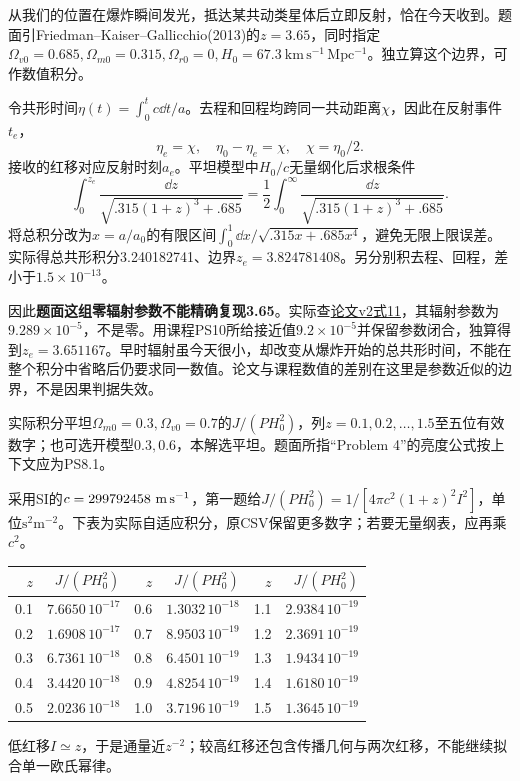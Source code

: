\begin{exercise}
从我们的位置在爆炸瞬间发光，抵达某共动类星体后立即反射，恰在今天收到。题面引Friedman--Kaiser--Gallicchio(2013)的$z=3.65$，同时指定$\Omega_{v0}=0.685,\Omega_{m0}=0.315,\Omega_{r0}=0,H_0=67.3\ \mathrm{km\,s^{-1}\,Mpc^{-1}}$。独立算这个边界，可作数值积分。
\end{exercise}
\begin{solution}
令共形时间$\eta(t)=\int_0^t c\dd t/a$。去程和回程均跨同一共动距离$\chi$，因此在反射事件$t_e$，
\[
 \eta_e=\chi,\quad \eta_0-\eta_e=\chi,\quad
 \chi=\eta_0/2.
\]
接收的红移对应反射时刻$a_e$。平坦模型中$H_0/c$无量纲化后求根条件
\[
 \int_0^{z_e}\frac{\dd z}{\sqrt{.315(1+z)^3+.685}}
 =\frac12\int_0^\infty\frac{\dd z}{\sqrt{.315(1+z)^3+.685}}.
\]
将总积分改为$x=a/a_0$的有限区间$\int_0^1\dd x/\sqrt{.315x+.685x^4}$，避免无限上限误差。实际得总共形积分3.240182741、边界$z_e=3.824781408$。另分别积去程、回程，差小于$1.5\times10^{-13}$。

因此\textbf{题面这组零辐射参数不能精确复现3.65}。实际查\href{https://arxiv.org/html/1305.3943v2}{论文v2式11}，其辐射参数为$9.289\times10^{-5}$，不是零。用课程PS10所给接近值$9.2\times10^{-5}$并保留参数闭合，独算得到$z_e=3.651167$。早时辐射虽今天很小，却改变从爆炸开始的总共形时间，不能在整个积分中省略后仍要求同一数值。论文与课程数值的差别在这里是参数近似的边界，不是因果判据失效。
\end{solution}

\begin{exercise}
实际积分平坦$\Omega_{m0}=0.3,\Omega_{v0}=0.7$的$J/(PH_0^2)$，列$z=0.1,0.2,\ldots,1.5$至五位有效数字；也可选开模型$0.3,0.6$，本解选平坦。题面所指“Problem 4”的亮度公式按上下文应为PS8.1。
\end{exercise}
\begin{solution}
采用SI的$c=299792458\ {\rm m\,s^{-1}}$，第一题给$J/(PH_0^2)=1/[4\pi c^2(1+z)^2I^2]$，单位$\mathrm{s^2m^{-2}}$。下表为实际自适应积分，原CSV保留更多数字；若要无量纲表，应再乘$c^2$。
\begin{center}\begin{tabular}{rr|rr|rr}
\toprule
$z$&$J/(PH_0^2)$&$z$&$J/(PH_0^2)$&$z$&$J/(PH_0^2)$\\
\midrule
0.1&$7.6650\,10^{-17}$&0.6&$1.3032\,10^{-18}$&1.1&$2.9384\,10^{-19}$\\
0.2&$1.6908\,10^{-17}$&0.7&$8.9503\,10^{-19}$&1.2&$2.3691\,10^{-19}$\\
0.3&$6.7361\,10^{-18}$&0.8&$6.4501\,10^{-19}$&1.3&$1.9434\,10^{-19}$\\
0.4&$3.4420\,10^{-18}$&0.9&$4.8254\,10^{-19}$&1.4&$1.6180\,10^{-19}$\\
0.5&$2.0236\,10^{-18}$&1.0&$3.7196\,10^{-19}$&1.5&$1.3645\,10^{-19}$\\
\bottomrule\end{tabular}\end{center}
低红移$I\simeq z$，于是通量近$z^{-2}$；较高红移还包含传播几何与两次红移，不能继续拟合单一欧氏幂律。
\end{solution}

